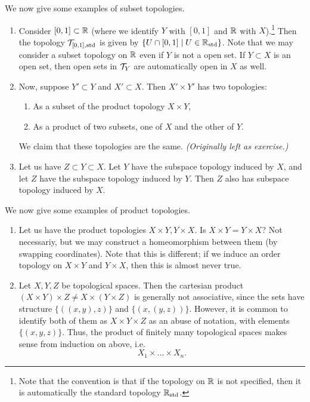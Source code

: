 \noindent We now give some examples of subset topologies.
\begin{enumerate}[label=(\alph*)]
    \item Consider $[0, 1] \subset \mathbb R$ (where we identify $Y$ with $[0, 1]$ and $\mathbb R$ with $X$).\footnote{Note that the convention is that if the topology on $\mathbb R$ is not specified, then it is automatically the standard topology $\mathbb R_\mathrm{std}$.} Then the topology $\mathcal T_{[0, 1], \mathrm{std}}$ is given by $\{ U \cap [0, 1] \mid U \in \mathbb R_\mathrm{std} \}$. Note that we may consider a subset topology on $\mathbb R$ even if $Y$ is not a open set.
    \medskip\newline
    If $Y \subset X$ is an open set, then open sets in $\mathcal T_Y$ are automatically open in $X$ as well.
    \item Now, suppose $Y' \subset Y$ and $X' \subset X$. Then $X' \times Y'$ has two topologies:
    \begin{enumerate}[label=(\alph*)]
        \item As a subset of the product topology $X \times Y$,
        \item As a product of two subsets, one of $X$ and the other of $Y$.
    \end{enumerate}
    We claim that these topologies are the same. \textit{(Originally left as exercise.)}
    \item Let us have $Z \subset Y \subset X$. Let $Y$ have the subspace topology induced by $X$, and let $Z$ have the subspace topology induced by $Y$. Then $Z$ also has subspace topology induced by $X$.
\end{enumerate}

\newpage
\noindent We now give some examples of product topologies.
\begin{enumerate}[label=(\alph*)]
    \item Let us have the product topologies $X \times Y, Y \times X$. Is $X \times Y = Y \times X$? Not necessariy, but we may construct a homeomorphism between them (by swapping coordinates). Note that this is different; if we induce an order topology on $X \times Y$ and $Y \times X$, then this is almost never true.
    \item Let $X, Y, Z$ be topological spaces. Then the cartesian product $(X \times Y) \times Z \neq X \times (Y \times Z)$
    is generally not associative, since the sets have structure $\{((x, y), z)\}$ and $\{(x, (y, z))\}$. However, it is common to identify both of them as $X \times Y \times Z$ as an abuse of notation, with elements $\{(x, y, z)\}$. Thus, the product of finitely many topological spaces makes sense from induction on above, i.e.
    \[ X_1 \times \dots \times X_n. \]
\end{enumerate}

